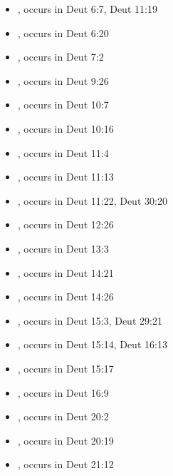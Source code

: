 \documentclass[14pt]{article}
\begin{document}
\begin{itemize}
\item {}, occurs in Deut 6:7, Deut 11:19

\item {}, occurs in Deut 6:20

\item {}, occurs in Deut 7:2

\item {}, occurs in Deut 9:26

\item {}, occurs in Deut 10:7

\item {}, occurs in Deut 10:16

\item {}, occurs in Deut 11:4

\item {}, occurs in Deut 11:13

\item {}, occurs in Deut 11:22, Deut 30:20

\item {}, occurs in Deut 12:26

\item {}, occurs in Deut 13:3

\item {}, occurs in Deut 14:21

\item {}, occurs in Deut 14:26

\item {}, occurs in Deut 15:3, Deut 29:21

\item {}, occurs in Deut 15:14, Deut 16:13

\item {}, occurs in Deut 15:17

\item {}, occurs in Deut 16:9

\item {}, occurs in Deut 20:2

\item {}, occurs in Deut 20:19

\item {}, occurs in Deut 21:12


\end{itemize}
\end{document}
